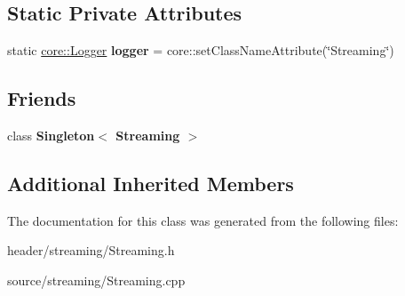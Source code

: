 \subsection*{Static Private Attributes}
\begin{DoxyCompactItemize}
\item 
\mbox{\label{class_streaming_ad41b4ed143e754dd8cd97e4b206cc9d6}} 
static \hyperlink{classcore_1_1_logger}{core\+::\+Logger} {\bfseries logger} = core\+::set\+Class\+Name\+Attribute(\char`\"{}Streaming\char`\"{})
\end{DoxyCompactItemize}
\subsection*{Friends}
\begin{DoxyCompactItemize}
\item 
\mbox{\label{class_streaming_a5bd956fbe03227a32971f58db030231a}} 
class {\bfseries Singleton$<$ Streaming $>$}
\end{DoxyCompactItemize}
\subsection*{Additional Inherited Members}


The documentation for this class was generated from the following files\+:\begin{DoxyCompactItemize}
\item 
header/streaming/Streaming.\+h\item 
source/streaming/Streaming.\+cpp\end{DoxyCompactItemize}
